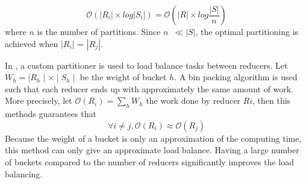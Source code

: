 \begin{equation}
\mathcal{O}\left(\left|R_i\right| \times log\left|S_i\right|\right) = \mathcal{O}\left(\left|R\right|\times log\frac{\left|S\right|}{n}\right) \label{eq:complexity2}
\end{equation}
where $n$ is the number of partitions. Since $n$~$\ll \left|S\right|$, the 
optimal partitioning is achieved when $\left| R_i \right|$ = $\left| R_j \right|$.

In \LSH, a custom partitioner is used to load balance tasks between reducers. Let $W_{h}=\mid R_{h} \mid \times \mid S_{h} \mid$ be the weight of bucket $h$. A bin packing algorithm is used such that each reducer ends up 
with approximately the same amount of work. More precisely, let $\mathcal{O}\left(R_i\right)  = \sum_{h}{W_{h}}$ the
work done by reducer $R{i}$, then this methods guarantees that 
\begin{equation}
\forall i \neq j, \mathcal{O}\left(R_i\right)  \approx  \mathcal{O}\left(R_j\right)
\end{equation}
Because the weight of a bucket is only an approximation of the computing time, this method can only give an
approximate load balance. Having a large number of buckets compared to the number of reducers significantly improves
the load balancing.   
%

